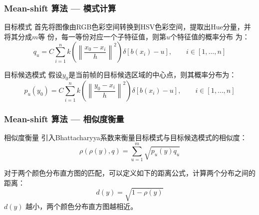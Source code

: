 \documentclass[xcolor=svgnames,serif,table]{beamer}
\begin{document}
\begin{frame}
  \frametitle{Mean-shift 算法 --- 模式计算}
  \begin{block}{目标模式}
    首先将图像由RGB色彩空间转换到HSV色彩空间，提取出Hue分量，并将其分成$m$等
    份，每一等份对应一个子特征值，则第$u$个特征值的概率分布
    为\cite{duda1973pattern}：
\begin{equation}
  \label{eq:characteristic-prob}
  q_{u}=C\sum_{i=1}^{n}k\left( \left\| \frac{x_{0}-x_{i}}{h} \right\|^{2}
  \right)\delta[b(x_{i})-u],\qquad i\in[1,\ldots,n]
\end{equation}
\end{block}

\pause

\begin{block}{目标候选模式}
  假设$y_0$是当前帧的目标候选区域的中心点，则其概率分布为：
\begin{equation}
  \label{eq:target-candidate}
  p_{u}(y_0)=C\sum_{i=1}^{n}k\left( \left\| \frac{y_{0}-x_{i}}{h} \right\|^{2}
  \right)\delta[b(x_{i})-u],\qquad i\in[1,\ldots,n]
\end{equation}
\end{block}
\end{frame}

\begin{frame}
  \frametitle{Mean-shift 算法 --- 相似度衡量}
  \begin{block}{相似度衡量}
    引入Bhattacharyya系数来衡量目标模式与目标候选模式的相似度：
\begin{equation}
  \label{eq:Bhattacharyya}
  \rho(\rho(y),q)=\sum_{u=1}^{m}\sqrt{p_{u}(y)q_{u}}
\end{equation}

对于两个颜色分布直方图的匹配，可以定义如下的距离公式，计算两个分布之间的距离：
\begin{equation}
  \label{eq:distance}
  d(y)=\sqrt{1-\rho(y)}
\end{equation}
$d(y)$ 越小，两个颜色分布直方图越相近。
  \end{block}
\end{frame}
\end{document}
